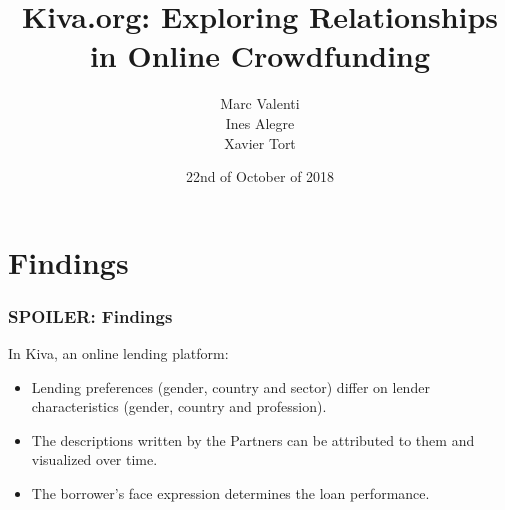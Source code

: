 \documentclass{beamer}
\begin{document}
\title{Kiva.org: Exploring Relationships in Online Crowdfunding}
\author{Marc Valenti \\ Ines Alegre \\ Xavier Tort}

\date{22nd of October of 2018}

\begin{frame}
\titlepage
\end{frame}

\section{Findings} 
\begin{frame}\frametitle{SPOILER: Findings}
In Kiva, an online lending platform:
\begin{itemize}
\item Lending preferences (gender, country and sector) differ on lender characteristics (gender, country and profession).
\item The descriptions written by the Partners can be attributed to them and visualized over time.
\item The borrower's face expression determines the loan performance.
\end{itemize}
\end{frame}



\end{document}

